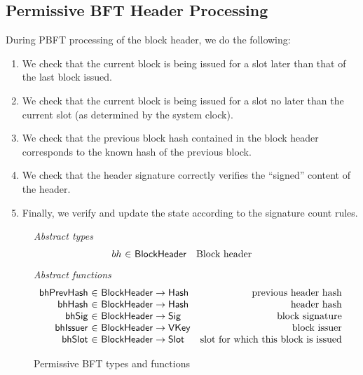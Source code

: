 \documentclass[11pt,a4paper]{article}
\newcommand{\fun}[1]{\mathsf{#1}}
\newcommand{\type}[1]{\mathsf{#1}}
\newcommand{\totalf}{\to}
\newcommand{\Hash}{\type{Hash}}  %
\newcommand{\Slot}{\type{Slot}}
\newcommand{\VKey}{\type{VKey}}
\newcommand{\Sig}{\type{Sig}}
\newcommand{\bhsigname}{bhSig}
\newcommand{\bhissuername}{bhIssuer}
\begin{document}
\clearpage

\subsection{Permissive BFT Header Processing}

\newcommand{\PBFTEnv}{\type{PBFTEnv}}
\newcommand{\PBFTState}{\type{PBFTState}}

\newcommand{\Bhead}{\type{BlockHeader}}
\newcommand{\Bhtosign}{\type{BHToSign}}

\newcommand{\bhslotname}{bhSlot}
\newcommand{\bhslot}[1]{\fun{\bhslotname}\ #1}
\newcommand{\bhhashname}{bhHash}
\newcommand{\bhhash}[1]{\fun{\bhhashname}\ #1}
\newcommand{\bhprevhashname}{bhPrevHash}
\newcommand{\bhprevhash}[1]{\fun{\bhprevhashname}\ #1}
\newcommand{\bhtosignname}{bhToSign}
\newcommand{\bhtosign}[1]{\fun{\bhtosignname}\ #1}

During PBFT processing of the block header, we do the following:
\begin{enumerate}
 \item We check that the current block is being issued for a slot later than
    that of the last block issued.
  \item We check that the current block is being issued for a slot no later than
    the current slot (as determined by the system clock).
  \item We check that the previous block hash contained in the block header
    corresponds to the known hash of the previous block.
  \item We check that the header signature correctly verifies the ``signed''
    content of the header.
  \item Finally, we verify and update the state according to the signature
    count rules.
  \end{enumerate}
  \begin{figure}[ht]
  \emph{Abstract types}
  \begin{equation*}
    \begin{array}{r@{~\in~}lr}
      bh & \Bhead & \text{Block header}
    \end{array}
  \end{equation*}
  \emph{Abstract functions}
  \begin{equation*}
    \begin{array}{r@{~\in~}lr}
      \fun{\bhprevhashname} & \Bhead \totalf \Hash & \text{previous header hash} \\
      \fun{\bhhashname} & \Bhead \totalf \Hash & \text{header hash} \\
      \fun{\bhsigname} & \Bhead \totalf \Sig & \text{block signature} \\
      \fun{\bhissuername} & \Bhead \totalf \VKey & \text{block issuer} \\
      \fun{\bhslotname} & \Bhead \totalf \Slot & \text{slot for which this block is issued}
    \end{array}
  \end{equation*}
  \caption{Permissive BFT types and functions}
  \label{fig:defs:pbft}
\end{figure}
\end{document}
